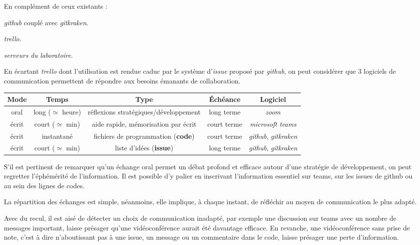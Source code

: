 En complément de ceux existants :

\begin{description}
\setlength\itemsep{-0.5em}
\item[Gestion de développement de logiciels :] \emph{\gls{github}} couplé avec \emph{\gls{gitkraken}}.
\item[Répartition de taches :] \emph{trello}.
\item[Partage de fichiers :] \emph{serveurs du laboratoire}.
\end{description}

En écartant \emph{trello} dont l'utilisation est rendue caduc par le système d'\emph{issue} proposé par \emph{github}, on peut considérer que 3 logiciels de communication permettent de répondre aux besoins émanants de collaboration.

\begin{table}[h]
\begin{center}
\begin{tabular}{|c|c|c|c|c|}
\hline
Mode & Temps & Type & \'Echéance & Logiciel\\
\hline
oral & long ($\simeq$ heure) & réflexions stratégiques/développement & long terme & \emph{zoom} \\
\hline
écrit & court ($\simeq$ min) & aide rapide, mémorisation par écrit  & court terme & \emph{microsoft teams} \\
\hline
écrit  &  instantané & fichiers de programmation (\textbf{code}) & court terme & \emph{github}, \emph{gitkraken} \\
\hline
écrit  &  court ($\simeq$ min) & liste d'idées (\textbf{issue}) & long terme & \emph{github}, \emph{gitkraken} \\
\hline
\end{tabular}
\end{center}
\end{table}

S'il est pertinent de remarquer qu'un échange oral permet un débat profond et efficace autour d'une stratégie de développement, on peut regretter l'éphémérité de l'information. Il est possible d'y palier en inscrivant l'information essentiel sur teams, sur les issues de github ou au sein des lignes de codes.

La répartition des échanges est simple, néanmoins, elle implique, à chaque instant, de réfléchir au moyen de communication le plus adapté.

Avec du recul, il est aisé de détecter un choix de communication inadapté, par exemple une discussion sur teams avec un nombre de messages important, laisse présager qu'une vidéoconférence aurait été davantage efficace. En revanche, une vidéoconférence sans prise de note, c'est à dire n'aboutissant pas à une issue, un message ou un commentaire dans le code, laisse présager une perte d'information.

